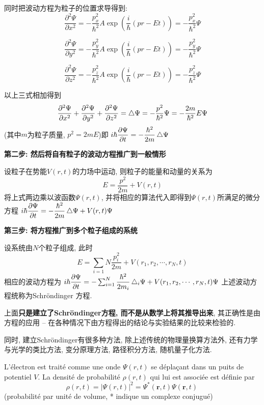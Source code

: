 \documentclass{article}
\begin{document}
同时把波动方程为粒子的位置求导得到:
$$
\dfrac{\partial^2 \Psi}{\partial x^2} 
= -\dfrac{p_x^2}{\hbar^2} A \exp(\dfrac{i}{\hbar} (p r - E t))
= -\dfrac{p_x^2}{\hbar^2} \Psi
$$

$$
\dfrac{\partial^2 \Psi}{\partial y^2} 
= -\dfrac{p_y^2}{\hbar^2} A \exp(\dfrac{i}{\hbar} (p r - E t))
= -\dfrac{p_y^2}{\hbar^2} \Psi
$$

$$
\dfrac{\partial^2 \Psi}{\partial z^2} 
= -\dfrac{p_z^2}{\hbar^2} A \exp(\dfrac{i}{\hbar} (p r - E t))
= -\dfrac{p_z^2}{\hbar^2} \Psi
$$

以上三式相加得到
$$
\dfrac{\partial^2 \Psi}{\partial x^2} + \dfrac{\partial^2 \Psi}{\partial y^2} + \dfrac{\partial^2 \Psi}{\partial z^2} 
= \mathop{}\!\mathbin\bigtriangleup{\Psi}
= -\dfrac{p^2}{\hbar^2} \Psi
= -\dfrac{2 m}{\hbar^2} E \Psi
$$
(其中$m$为粒子质量, $p^2 = 2mE$)即
$i \hbar \dfrac{\partial \Psi}{\partial t} = - \dfrac{\hbar^2}{2m} \mathop{}\!\mathbin\bigtriangleup{\Psi}$

\textbf{第二步: 然后将自有粒子的波动方程推广到一般情形}

设粒子在势能$V(r,t)$的力场中运动, 则粒子的能量和动量的关系为
$$ E = \dfrac{p^2}{2m} + V(r,t) $$
将上式两边乘以波函数$\Psi(r,t)$, 并将相应的算法代入即得到$\Psi(r,t)$所满足的微分方程
$i \hbar \dfrac{\partial \Psi}{\partial t} = - \dfrac{\hbar^2}{2m} \mathop{}\!\mathbin\bigtriangleup{\Psi} + V(r,t) \Psi$

\textbf{第三步: 将方程推广到多个粒子组成的系统}

设系统由$N$个粒子组成, 此时
$$ E = \sum_{i=1}{N} \dfrac{p_i^2}{2m} + V(r_1, r_2, \cdots, r_N, t) $$
相应的波动方程为
$i \hbar \dfrac{\partial \Psi}{\partial t} = - \sum_{i=1}^N \dfrac{\hbar^2}{2m_i} \mathop{}\!\mathbin\bigtriangleup_i{\Psi} + V(r_1, r_2, \cdots, r_N, t) \Psi$
上述波动方程统称为Schr\"ondinger 方程.

上面\textbf{只是建立了Schr\"ondinger方程, 而不是从数学上将其推导出来}, 其正确性是由方程的应用 -- 在各种情况下由方程得出的结论与实验结果的比较来检验的.

同时, 建立Schr\"ondinger有很多种方法, 除上述传统的物理量换算方法外, 还有力学与光学的类比方法, 变分原理方法, 路径积分方法, 随机量子化方法.

L'\'electron est trait\'e comme une onde $\Psi(r,t)$ se d\'epla\c cant dans un puits de potentiel $V$.
La densit\'e de probabilit\'e $\rho(r,t)$ qui lui est associ\'ee est d\'efinie par
$$ \rho(r,t)= |\Psi(r,t)|^2=\Psi^*(\mathbf{r},t)\Psi(\mathbf{r},t)\,\!  $$
(probabilit\'e par unit\'e de volume, * indique un complexe conjugu\'e)
\end{document}
